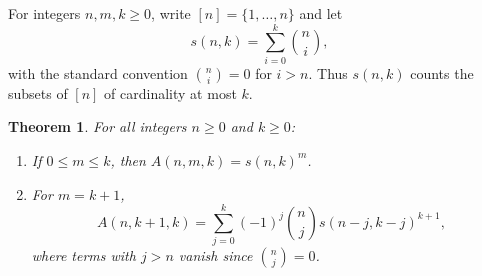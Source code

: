 \documentclass[11pt]{article}
\newtheorem{theorem}{Theorem}
\begin{document}
For integers $n, m, k \ge 0$, write $[n] = \{1, \dots, n\}$ and let
\[
  s(n, k) = \sum_{i=0}^{k} \binom{n}{i},
\]
with the standard convention $\binom{n}{i} = 0$ for $i > n$. Thus $s(n, k)$ counts the subsets of $[n]$ of cardinality at most $k$.

\begin{theorem}\label{thm:main}
For all integers $n \ge 0$ and $k \ge 0$:
\begin{enumerate}
  \item If $0 \le m \le k$, then $A(n, m, k) = s(n, k)^m$.
  \item For $m = k + 1$,
  \[
    A(n, k + 1, k) = \sum_{j=0}^{k} (-1)^j \binom{n}{j} s(n - j, k - j)^{k + 1},
  \]
  where terms with $j > n$ vanish since $\binom{n}{j} = 0$.
\end{enumerate}
\end{theorem}
\end{document}
